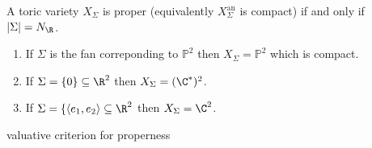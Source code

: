 \documentclass[a4paper]{article}
\renewcommand*{\P}{\mathbb{P}}
\begin{document}
\begin{proposition}
  A toric variety \(X_\Sigma\) is proper (equivalently \(X_\Sigma^{\text{an}}\) is compact) if and only if \(|\Sigma| = N_\R\).
\end{proposition}

\begin{eg}\leavevmode
  \begin{enumerate}
  \item If \(\Sigma\) is the fan correponding to \(\P^2\) then \(X_\Sigma = \P^2\) which is compact.
  \item If \(\Sigma = \{0\} \subseteq \R^2\) then \(X_\Sigma = (\C^*)^2\).
  \item If \(\Sigma = \{\langle e_1, e_ 2\rangle \subseteq \R^2\) then \(X_\Sigma = \C^2\).
  \end{enumerate}
\end{eg}

valuative criterion for properness

\printindex
\end{document}
